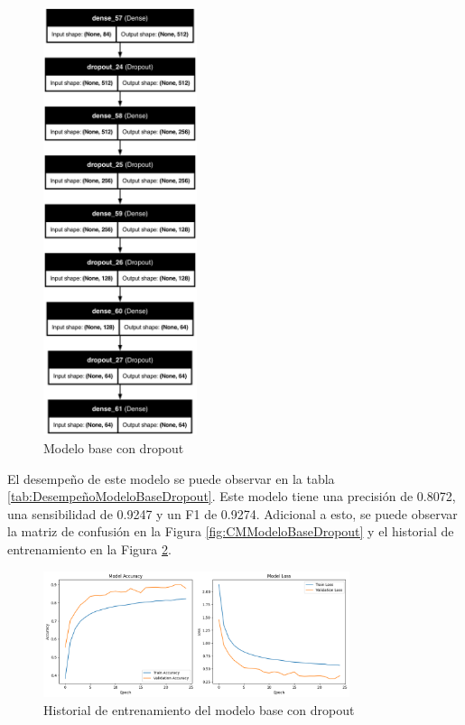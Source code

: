 \begin{figure}[H]
    \centering
    \includegraphics[width=0.4\textwidth]{figuras/modelDropout.png}
    \caption{Modelo base con dropout}
    \label{fig:ModeloBaseDropout}
\end{figure}

El desempeño de este modelo se puede observar en la tabla \ref{tab:DesempeñoModeloBaseDropout}.
Este modelo tiene una precisión de 0.8072, una sensibilidad de 0.9247 y un F1 de 0.9274.
Adicional a esto, se puede observar la matriz de confusión en la Figura \ref{fig:CMModeloBaseDropout} y el historial de entrenamiento en la Figura \ref{fig:HistoryModeloBaseDropout}.

\begin{figure}[H]
    \centering
    \includegraphics[width=0.8\textwidth]{figuras/modelDropoutHistory.png}
    \caption{Historial de entrenamiento del modelo base con dropout}
    \label{fig:HistoryModeloBaseDropout}
\end{figure}

